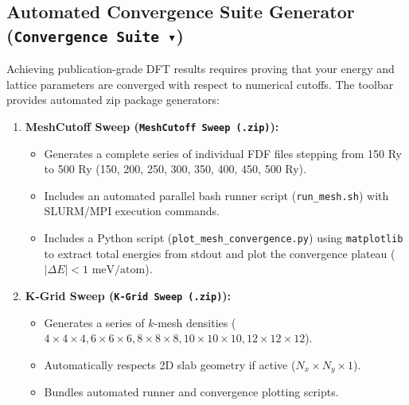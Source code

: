 \documentclass[11pt,a4paper]{article}
\begin{document}
\subsection{Automated Convergence Suite Generator (\texttt{Convergence Suite ▾})}
Achieving publication-grade DFT results requires proving that your energy and lattice parameters are converged with respect to numerical cutoffs. The toolbar provides automated zip package generators:
\begin{enumerate}[leftmargin=*]
 \item \textbf{MeshCutoff Sweep (\texttt{MeshCutoff Sweep (.zip)}):}
 \begin{itemize}
 \item Generates a complete series of individual FDF files stepping from 150 Ry to 500 Ry (150, 200, 250, 300, 350, 400, 450, 500 Ry).
 \item Includes an automated parallel bash runner script (\texttt{run\_mesh.sh}) with SLURM/MPI execution commands.
 \item Includes a Python script (\texttt{plot\_mesh\_convergence.py}) using \texttt{matplotlib} to extract total energies from stdout and plot the convergence plateau ($|\Delta E| < 1\text{ meV/atom}$).
 \end{itemize}
 \item \textbf{K-Grid Sweep (\texttt{K-Grid Sweep (.zip)}):}
 \begin{itemize}
 \item Generates a series of $k$-mesh densities ($4\times4\times4, 6\times6\times6, 8\times8\times8, 10\times10\times10, 12\times12\times12$).
 \item Automatically respects 2D slab geometry if active ($N_x \times N_y \times 1$).
 \item Bundles automated runner and convergence plotting scripts.
 \end{itemize}
\end{enumerate}
\end{document}
